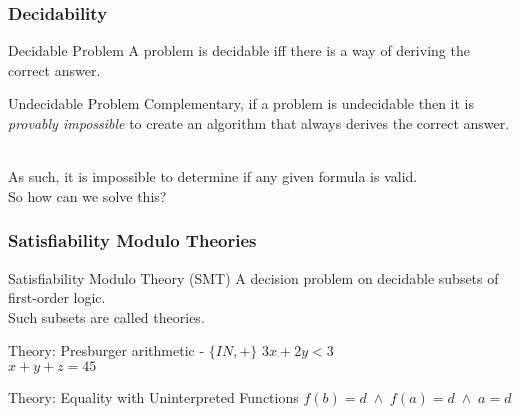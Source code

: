\documentclass{beamer}
\makeatletter
\newcommand{\hl}{\textcolor{fibeamer@darkColor1}}
\makeatother
\begin{document}
\begin{frame}
    \frametitle{Decidability}

    \begin{block}{Decidable Problem}
        A problem is \hl{decidable} iff there is a way of deriving the correct answer.
    \end{block}

		\begin{block}{Undecidable Problem}
        Complementary, if a problem is \hl{undecidable} then it is \textit{provably
				impossible} to create an algorithm that always derives the correct answer.
    \end{block}~\\

		\pause
		As such, it is impossible to determine if any given formula is valid.\\
		So how can we solve this?

\end{frame}

\begin{frame}
    \frametitle{Satisfiability Modulo Theories}

    \begin{block}{Satisfiability Modulo Theory (SMT)}
		A decision problem on \hl{decidable subsets} of first-order logic.\\
		Such subsets are called \hl{theories}.
    \end{block}

		\begin{exampleblock}{Theory: Presburger arithmetic - $\{I\!N, +\}$}
        $3x + 2y < 3$\\
        $x + y + z = 45$
    \end{exampleblock}

		\pause

		\begin{exampleblock}{Theory: Equality with Uninterpreted Functions}
        $f(b) = d \; \wedge \; f(a) = d \; \wedge \; a = d$
    \end{exampleblock}

\end{frame}
\end{document}
